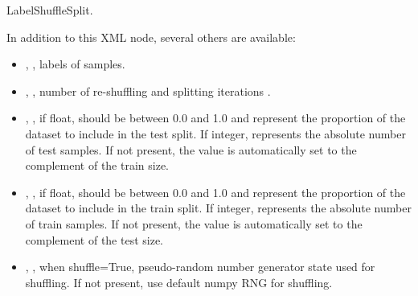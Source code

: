 LabelShuffleSplit.

In addition to this XML node, several others are available:
\begin{itemize}
  \item {}, , labels of samples.
  \item {}, , number of re-shuffling and splitting iterations
    .
  \item {}, , if float, should be between 0.0 and 1.0 and
    represent the proportion of the dataset to include in the test split. 
    If integer, represents the absolute number of test samples. If not present, the value is automatically set to
    the complement of the train size.
  \item {}, , if float, should be between 0.0 and 1.0 and represent
    the proportion of the dataset to include in the train split. If integer, represents the absolute number of train
    samples. If not present, the value is automatically set to the complement of the test size.
  \item {}, , when shuffle=True,
    pseudo-random number generator state used for shuffling. If not present, use default numpy RNG for shuffling.
\end{itemize}

